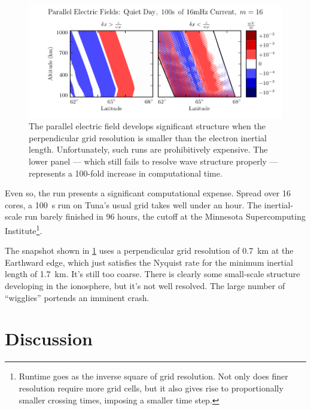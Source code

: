 \begin{figure}[!htb]
    \centering
    \includegraphics[width=\textwidth]{figures/inertial_length.pdf}
    \caption[Parallel Electric Fields by Perpendicular Grid Resolution]{
      The parallel electric field develops significant structure when the perpendicular grid resolution is smaller than the electron inertial length. Unfortunately, such runs are prohibitively expensive. The lower panel --- which still fails to resolve wave structure properly --- represents a 100-fold increase in computational time. 
    }
    \label{fig_inertial_length}
\end{figure}

Even so, the run presents a significant computational expense. Spread over 16 cores, a \SI{100}{\s} run on Tuna's usual grid takes well under an hour. The inertial-scale run barely finished in 96 hours, the cutoff at the Minnesota Supercomputing Institute\footnote{Runtime goes as the inverse square of grid resolution. Not only does finer resolution require more grid cells, but it also gives rise to proportionally smaller crossing times, imposing a smaller time step. }.

The snapshot shown in \cref{fig_inertial_length} uses a perpendicular grid resolution of \SI{0.7}{\km} at the Earthward edge, which just satisfies the Nyquist rate for the minimum inertial length of \SI{1.7}{\km}. It's still too coarse. There is clearly some small-scale structure developing in the ionosphere, but it's not well resolved. The large number of ``wigglies'' portends an imminent crash. 


\section{Discussion}

